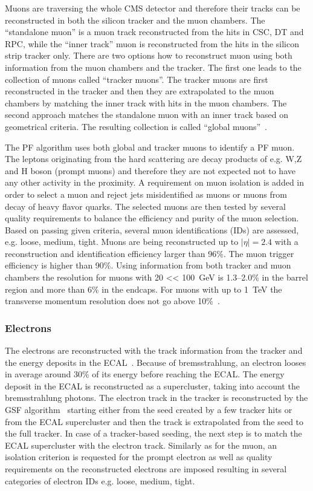 Muons are traversing the whole CMS detector and therefore their tracks can be reconstructed in both the silicon tracker and the muon chambers. The ``standalone muon'' is a muon track reconstructed from the hits in CSC, DT and RPC, while the ``inner track'' muon is reconstructed from the hits in the silicon strip tracker only. There are two options how to reconstruct muon using both information from the muon chambers and the tracker. The first one leads to the collection of muons called ``tracker muons''.  The tracker muons are first reconstructed in the tracker and then they are extrapolated to the muon chambers by matching the inner track with hits in the muon chambers. The second approach matches the standalone muon with an inner track based on geometrical criteria. The resulting collection is called ``global muons''~\cite{Chatrchyan:2012xi}. 

The PF algorithm uses both global and tracker muons to identify a PF muon. The leptons originating from the hard scattering are decay products of e.g. W,Z and H boson (prompt muons) and therefore they are not expected not to have any other activity in the proximity. A requirement on muon isolation is added in order to select a muon and reject jets misidentified as muons or muons from decay of heavy flavor quarks. The selected muons are then tested by several quality requirements to balance the efficiency and purity of the muon selection. Based on passing given criteria, several muon identifications (IDs) are assessed, e.g. loose, medium, tight. Muons are being reconstructed up to $|\eta|=2.4$ with a reconstruction and identification efficiency larger than 96\%. The muon trigger efficiency is higher than 90\%. Using information from both tracker and muon chambers the \pt resolution for muons with 20 <\pt < 100~GeV is 1.3--2.0\% in the barrel region and more than 6\% in the endcaps. For muons with \pt up to 1~TeV the transverse momentum resolution does not go above 10\%~\cite{Chatrchyan:2012xi}.

\subsubsection{Electrons}

The electrons are reconstructed with the track information from the tracker and the energy deposits in the ECAL~\cite{Khachatryan:2015hwa}. Because of bremsstrahlung, an electron looses in average around 30\% of its energy before reaching the ECAL. The energy deposit in the ECAL is reconstructed as a supercluster, taking into account the bremsstrahlung photons. The electron track in the tracker is reconstructed by the GSF algorithm~\cite{Adam:2003kg} starting either from the seed created by a few tracker hits or from the ECAL supercluster and then the track is extrapolated from the seed to the full tracker. In case of a tracker-based seeding, the next step is to match the ECAL supercluster with the electron track. Similarly as for the muon, an isolation criterion is requested for the prompt electron as well as quality requirements on the reconstructed electrons are imposed resulting in several categories of electron IDs e.g. loose, medium, tight.

